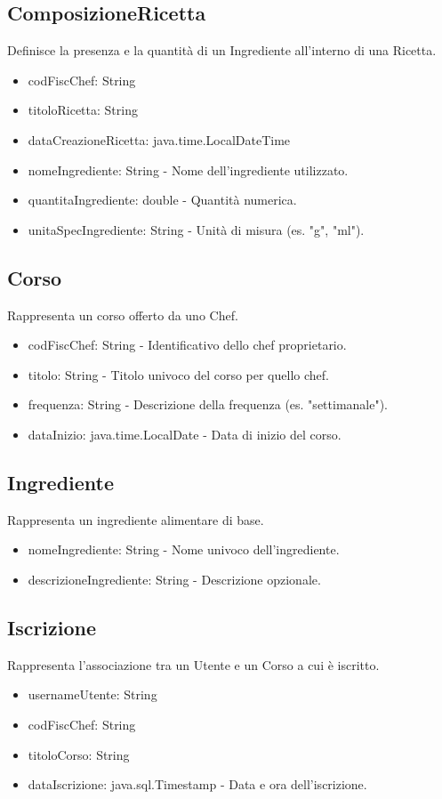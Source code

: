\documentclass[a4paper, 12pt]{article}
\begin{document}
\subsection{ComposizioneRicetta}
Definisce la presenza e la quantità di un Ingrediente all'interno di una Ricetta.
\begin{itemize}
    \item codFiscChef: String
    \item titoloRicetta: String
    \item dataCreazioneRicetta: java.time.LocalDateTime
    \item nomeIngrediente: String - Nome dell'ingrediente utilizzato.
    \item quantitaIngrediente: double - Quantità numerica.
    \item unitaSpecIngrediente: String - Unità di misura (es. "g", "ml").
\end{itemize}

\subsection{Corso}
Rappresenta un corso offerto da uno Chef.
\begin{itemize}
    \item codFiscChef: String - Identificativo dello chef proprietario.
    \item titolo: String - Titolo univoco del corso per quello chef.
    \item frequenza: String - Descrizione della frequenza (es. "settimanale").
    \item dataInizio: java.time.LocalDate - Data di inizio del corso.
\end{itemize}

\subsection{Ingrediente}
Rappresenta un ingrediente alimentare di base.
\begin{itemize}
    \item nomeIngrediente: String - Nome univoco dell'ingrediente.
    \item descrizioneIngrediente: String - Descrizione opzionale.
\end{itemize}

\subsection{Iscrizione}
Rappresenta l'associazione tra un Utente e un Corso a cui è iscritto.
\begin{itemize}
    \item usernameUtente: String
    \item codFiscChef: String
    \item titoloCorso: String
    \item dataIscrizione: java.sql.Timestamp - Data e ora dell'iscrizione.
\end{itemize}
\end{document}
